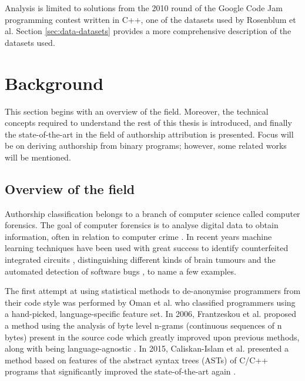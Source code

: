 \documentclass[a4paper,11pt]{kth-mag}
\begin{document}
Analysis is limited to solutions from the 2010 round of the Google Code Jam
programming contest written in C++, one of the datasets used by Rosenblum et
al. Section \ref{sec:data-datasets} provides a more comprehensive description
of the datasets used.

\chapter{Background}
This section begins with an overview of the field. Moreover, the
technical concepts required to understand the rest of this thesis is introduced, and finally
the state-of-the-art in the field of authorship attribution is presented. Focus will
be on deriving authorship from binary programs; however, some related works
will be mentioned.

\section{Overview of the field}
Authorship classification belongs to a branch of computer science called
computer forensics. The goal of computer forensics is to analyse digital data
to obtain information, often in relation to computer crime
\parencite{reith2002examination}. In recent years machine learning techniques
have been used with great success to identify counterfeited integrated circuits
\parencite{huang2013counterfeit}, distinguishing different kinds of brain
tumours \parencite{zacharaki2009classification} and the automated detection of
software bugs \parencite{aleem2015comparative}, to name a few examples.

The first attempt at using statistical methods to de-anonymise programmers from
their code style was performed by Oman et al. \parencite{oman1989programming}
who classified programmers using a hand-picked, language-specific feature set.
In 2006, Frantzeskou et al. proposed a method using the analysis of byte level
n-grams (continuous sequences of n bytes) present in the source code which
greatly improved upon previous methods, along with being language-agnostic
\parencite{frantzeskou2006source}. In 2015, Caliskan-Islam et al. presented a
method based on features of the abstract syntax trees (ASTs) of C/C++ programs
that significantly improved the state-of-the-art again
\parencite{caliskan2015anonymizing}.
 
\end{document}
